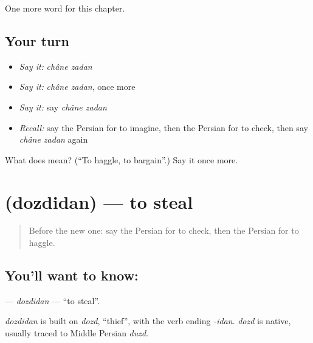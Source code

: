 \begin{grammarlens}[title={What you've built}]
One more word for this chapter.
\end{grammarlens}

\subsection*{Your turn}
\begin{itemize}
\raggedright
  \item \emph{Say it:} \emph{châne zadan}
  \item \emph{Say it:} \emph{châne zadan}, once more
  \item \emph{Say it:} say \emph{châne zadan}
  \item \emph{Recall:} say the Persian for to imagine, then the Persian for to check, then say \emph{châne zadan} again
\end{itemize}

\begin{tcolorbox}[breakable,colback=teal!4,colframe=teal!35!black,title={Before you move on}]
What does   mean? (\textquotedblleft{}To haggle, to bargain\textquotedblright{}.) Say it once more.
\end{tcolorbox}
\section[\texorpdfstring{\fa{دزدیدن} (dozdidan)}{دزدیدن (dozdidan)}]{ (dozdidan) — to steal}

\label{lesson:FA-C259-dozdidan}



\begin{quote}
Before the new one: say the Persian for to check, then the Persian for to haggle.
\end{quote}

\subsection*{You'll want to know: }
\textbf{} — \emph{dozdidan} — \textquotedblleft{}to steal\textquotedblright{}.

\begin{cousinweb}
\emph{dozdidan} is built on \emph{dozd}, \textquotedblleft{}thief\textquotedblright{}, with the verb ending \emph{-idan}. \emph{dozd} is native, usually traced to Middle Persian \emph{duzd}.
\end{cousinweb}

